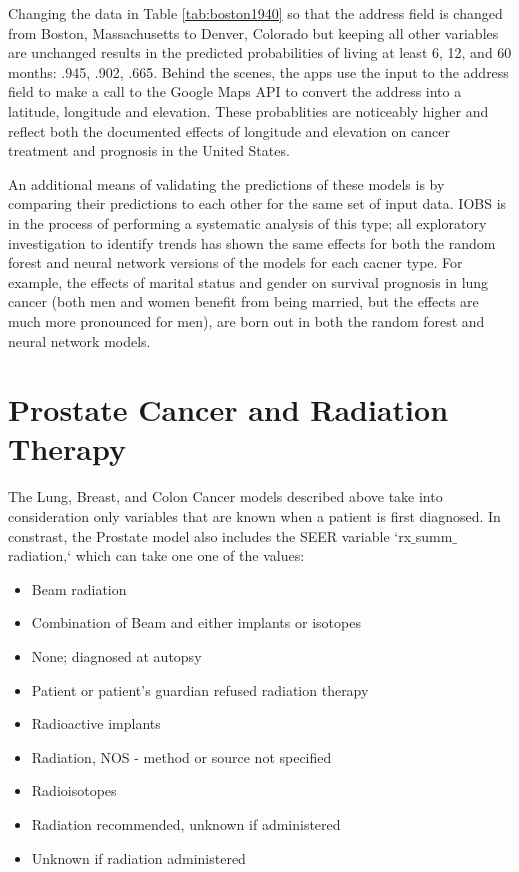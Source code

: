 \documentclass{article}
\begin{document}
Changing the data in Table \ref{tab:boston1940} so that the address field is changed from Boston, Massachusetts to Denver, Colorado but keeping all other variables are unchanged results in the predicted probabilities of living at least 6, 12, and 60 months: .945, .902, .665. 
Behind the scenes, the apps use the input to the address field to make a call to the Google Maps API to convert the address into a latitude, longitude and elevation.
These probablities are noticeably higher and reflect both the documented effects of longitude and elevation on cancer treatment and prognosis in the United States.

An additional means of validating the predictions of these models is by comparing their predictions to each other for the same set of input data. IOBS is in the process of performing a systematic analysis of this type; all exploratory investigation to identify trends has shown the same effects for both the random forest and neural network versions of the models for each cacner type. For example, the effects of marital status and gender on survival prognosis in lung cancer (both men and women benefit from being married, but the effects are much more pronounced for men), are born out in both the random forest and neural network models. 

\section{Prostate Cancer and Radiation Therapy}

The Lung, Breast, and Colon Cancer models described above take into consideration only variables that are known when a patient is first diagnosed. In constrast, the Prostate model also includes the SEER variable `rx$\_$summ$\_$radiation,` which can take one one of the values:

\begin{itemize}
\item Beam radiation
\item Combination of Beam and either implants or isotopes
\item None; diagnosed at autopsy
\item Patient or patient's guardian refused radiation therapy
\item Radioactive implants
\item Radiation, NOS - method or source not specified
\item Radioisotopes
\item Radiation recommended, unknown if administered
\item Unknown if radiation administered
\end{itemize}
\end{document}

